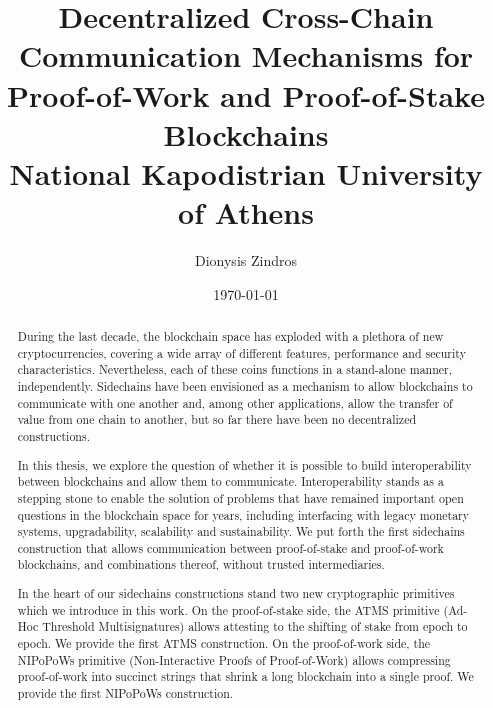 \documentclass{report}
\begin{document}
\begin{titlepage}
  \title{
    {Decentralized Cross-Chain Communication Mechanisms for Proof-of-Work and Proof-of-Stake Blockchains} \\
  {\large National Kapodistrian University of Athens} \\
  }
  \author{Dionysis Zindros}
  \date{\today}
  \maketitle
\end{titlepage}

\newpage

\thispagestyle{empty}
\null

\newpage

\begin{abstract}
During the last decade, the blockchain space has exploded with a plethora of new cryptocurrencies, covering a wide array of different features, performance and security characteristics. Nevertheless, each of these coins functions in a stand-alone manner, independently.  Sidechains have been envisioned as a mechanism to allow blockchains to communicate with one another and, among other applications, allow the transfer of value from one chain to another, but so far there have been no decentralized constructions.

In this thesis, we explore the question of whether it is possible to build interoperability between blockchains and allow them to communicate. Interoperability stands as a stepping stone to enable the solution of problems that have remained important open questions in the blockchain space for years, including interfacing with legacy monetary systems, upgradability, scalability and sustainability. We put forth the first sidechains construction that allows communication between proof-of-stake and proof-of-work blockchains, and combinations thereof, without trusted intermediaries.

In the heart of our sidechains constructions stand two new cryptographic primitives which we introduce in this work. On the proof-of-stake side, the ATMS primitive (Ad-Hoc Threshold Multisignatures) allows attesting to the shifting of stake from epoch to epoch. We provide the first ATMS construction. On the proof-of-work side, the NIPoPoWs primitive (Non-Interactive Proofs of Proof-of-Work) allows compressing proof-of-work into succinct strings that shrink a long blockchain into a single proof. We provide the first NIPoPoWs construction.


\end{abstract}
\end{document}
